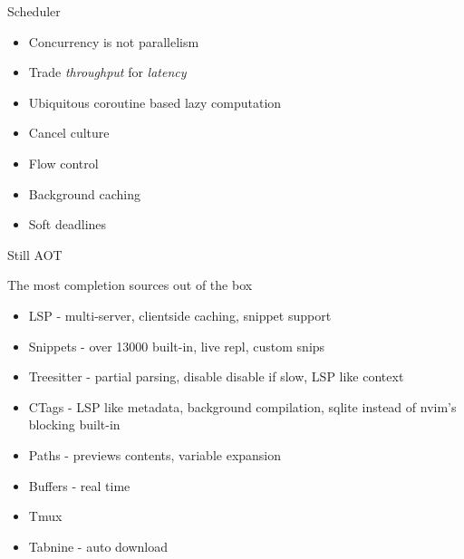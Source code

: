 \documentclass{beamer}
\begin{document}
\begin{frame}{Scheduler}
	
	\begin{itemize}

		\item Concurrency is not parallelism

		\item Trade \textit{throughput} for \textit{latency}

		\item Ubiquitous coroutine based lazy computation

		\item Cancel culture

		\item Flow control

		\item Background caching

		\item Soft deadlines

	\end{itemize}

\end{frame}


\begin{frame}{Still AOT}
	
	The most completion sources out of the box

	\begin{itemize}

		\item LSP - multi-server, clientside caching, snippet support

		\item Snippets - over 13000 built-in, live repl, custom snips

		\item Treesitter - partial parsing, disable disable if slow, LSP like context

		\item CTags - LSP like metadata, background compilation, sqlite instead of nvim's blocking built-in

		\item Paths - previews contents, variable expansion

		\item Buffers - real time

		\item Tmux

		\item Tabnine - auto download

	\end{itemize}

\end{frame}
\end{document}
